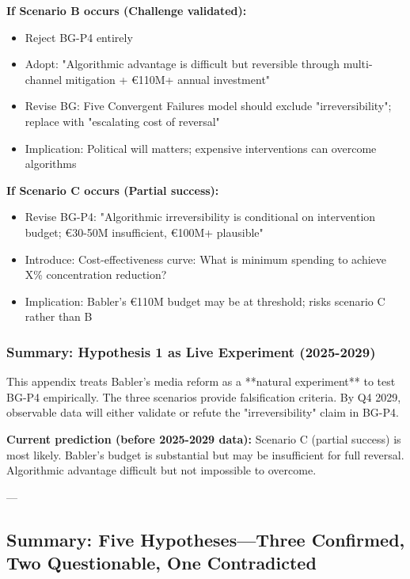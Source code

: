 \textbf{If Scenario B occurs (Challenge validated):}
\begin{itemize}
\item Reject BG-P4 entirely
\item Adopt: "Algorithmic advantage is difficult but reversible through multi-channel mitigation + €110M+ annual investment"
\item Revise BG: Five Convergent Failures model should exclude "irreversibility"; replace with "escalating cost of reversal"
\item Implication: Political will matters; expensive interventions can overcome algorithms
\end{itemize}

\textbf{If Scenario C occurs (Partial success):}
\begin{itemize}
\item Revise BG-P4: "Algorithmic irreversibility is conditional on intervention budget; €30-50M insufficient, €100M+ plausible"
\item Introduce: Cost-effectiveness curve: What is minimum spending to achieve X\% concentration reduction?
\item Implication: Babler's €110M budget may be at threshold; risks scenario C rather than B
\end{itemize}

\subsubsection*{Summary: Hypothesis 1 as Live Experiment (2025-2029)}

This appendix treats Babler's media reform as a **natural experiment** to test BG-P4 empirically. The three scenarios provide falsification criteria. By Q4 2029, observable data will either validate or refute the "irreversibility" claim in BG-P4.

\textbf{Current prediction (before 2025-2029 data):} Scenario C (partial success) is most likely. Babler's budget is substantial but may be insufficient for full reversal. Algorithmic advantage difficult but not impossible to overcome.

---

\subsection*{Summary: Five Hypotheses—Three Confirmed, Two Questionable, One Contradicted}

